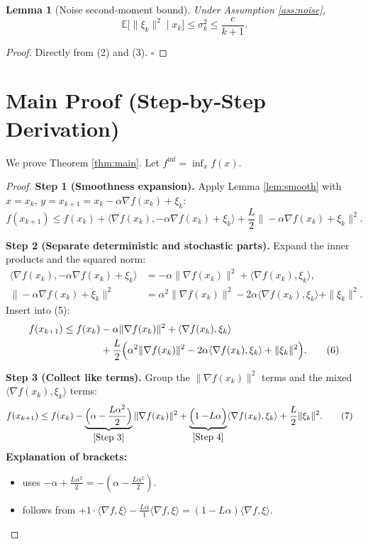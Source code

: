 \documentclass{article}
\newtheorem{lemma}{Lemma}
\newcommand{\E}{\mathbb{E}}
\begin{document}
\begin{lemma}[Noise second‑moment bound]\label{lem:noise}
Under Assumption \ref{ass:noise},
\[
\E\bigl[\|\xi_k\|^{2}\mid x_k\bigr]\le \sigma_k^{2}\le\frac{c}{k+1}.
\tag{L2}
\]
\end{lemma}
\begin{proof}
Directly from (2) and (3). \hfill $\square$
\end{proof}

\section*{Main Proof (Step‑by‑Step Derivation)}
We prove Theorem \ref{thm:main}. Let $f^{\inf}=\inf_{x}f(x)$.
\begin{proof}
\textbf{Step 1 (Smoothness expansion).}  
Apply Lemma \ref{lem:smooth} with $x=x_k$, $y=x_{k+1}=x_k-\alpha\nabla f(x_k)+\xi_k$:
\[
f(x_{k+1})\le f(x_k)+\langle\nabla f(x_k),-\alpha\nabla f(x_k)+\xi_k\rangle
+\frac{L}{2}\|-\alpha\nabla f(x_k)+\xi_k\|^{2}.
\tag{5}
\]

\textbf{Step 2 (Separate deterministic and stochastic parts).}  
Expand the inner products and the squared norm:
\begin{align*}
\langle\nabla f(x_k),-\alpha\nabla f(x_k)+\xi_k\rangle
&=-\alpha\|\nabla f(x_k)\|^{2}
+\langle\nabla f(x_k),\xi_k\rangle,\\[4pt]
\|-\alpha\nabla f(x_k)+\xi_k\|^{2}
&=\alpha^{2}\|\nabla f(x_k)\|^{2}
-2\alpha\langle\nabla f(x_k),\xi_k\rangle
+\|\xi_k\|^{2}.
\end{align*}
Insert into (5):
\begin{align}
f(x_{k+1})\le f(x_k)
&-\alpha\|\nabla f(x_k)\|^{2}
+\langle\nabla f(x_k),\xi_k\rangle \nonumber\\
&+\frac{L}{2}\Bigl(\alpha^{2}\|\nabla f(x_k)\|^{2}
-2\alpha\langle\nabla f(x_k),\xi_k\rangle
+\|\xi_k\|^{2}\Bigr).
\tag{6}
\end{align}

\textbf{Step 3 (Collect like terms).}  
Group the $\|\nabla f(x_k)\|^{2}$ terms and the mixed $\langle\nabla f(x_k),\xi_k\rangle$ terms:
\begin{align}
f(x_{k+1})
&\le f(x_k)
-\underbrace{\Bigl(\alpha-\frac{L\alpha^{2}}{2}\Bigr)}_{\displaystyle \text{[Step 3]}}\|\nabla f(x_k)\|^{2}
+\underbrace{\Bigl(1-\!L\alpha\Bigr)}_{\displaystyle \text{[Step 4]}}\langle\nabla f(x_k),\xi_k\rangle
+\frac{L}{2}\|\xi_k\|^{2}.
\tag{7}
\end{align}
\textbf{Explanation of brackets:}
\begin{itemize}
\item[Step 3] uses $-\alpha +\frac{L\alpha^{2}}{2}=-(\alpha-\frac{L\alpha^{2}}{2})$.
\item[Step 4] follows from $+1\cdot\langle\nabla f,\xi\rangle-\frac{L\alpha}{1}\langle\nabla f,\xi\rangle=(1-L\alpha)\langle\nabla f,\xi\rangle$.
\end{itemize}


\end{proof}
\end{document}
